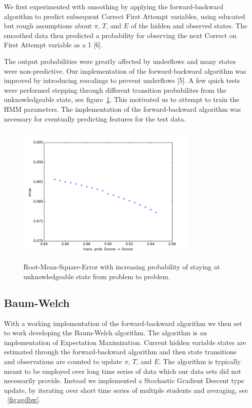 \documentclass{article} %
\begin{document}
We first experimented with smoothing by applying the forward-backward algorithm to predict subsequent Correct First Attempt variables, using educated but rough assumptions about $\pi$, $T$, and $E$ of the hidden and observed states. The smoothed data then predicted a probability for observing the next Correct on First Attempt variable as a 1 [6].

The output probabilities were greatly affected by underflows and many states were non-predictive. Our implementation of the forward-backward algorithm was improved by introducing rescalings to prevent underflows [5]. A few quick tests were performed stepping through different transition probabilites from the unknowledgeable state, see figure~\ref{fig:dunno}. This motivated us to attempt to train the HMM parameters. The implementation of the forward-backward algorithm was necessary for eventually predicting features for the test data.

\begin{figure}[h]
\begin{center}
\includegraphics[width=0.8\textwidth]{dunno.png}
\label{fig:dunno}
\end{center}
\caption{Root-Mean-Square-Error with increasing probability of staying at unknowledgeable state from problem to problem.}
\end{figure}

\subsection{Baum-Welch}
With a working implementation of the forward-backward algorithm we then set to work developing the Baum-Welch algorithm. The algorithm is an implementation of Expectation Maximization. Current hidden variable states are estimated through the forward-backward algorithm and then state transitions and observations are counted to update $\pi$, $T$, and $E$. The algorithm is typically meant to be employed over long time series of data which our data sets did not necessarily provide. Instead we implemented a Stochastic Gradient Descent type update, by iterating over short time series of multiple students and averaging, see ~\ref{fig:sgdbw}.
\end{document}
